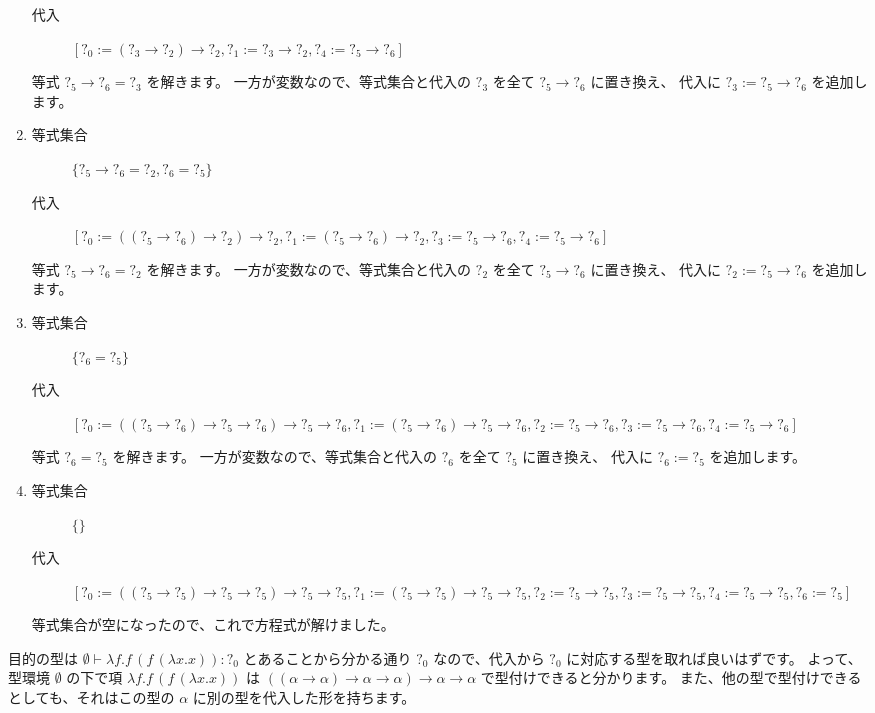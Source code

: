 \begin{enumerate}
\begin{description}
      \item[代入]
        $[?_0 := (?_3 \to ?_2) \to ?_2, ?_1 := ?_3 \to ?_2, ?_4 := ?_5 \to ?_6]$
    \end{description}
    等式 $?_5 \to ?_6 = ?_3$ を解きます。
    一方が変数なので、等式集合と代入の $?_3$ を全て $?_5 \to ?_6$ に置き換え、
    代入に $?_3 := ?_5 \to ?_6$ を追加します。
  \item
    \begin{description}
      \item[等式集合]
        $\{?_5 \to ?_6 = ?_2, ?_6 = ?_5\}$
      \item[代入]
        $[?_0 := ((?_5 \to ?_6) \to ?_2) \to ?_2, ?_1 := (?_5 \to ?_6) \to ?_2,
          ?_3 := ?_5 \to ?_6, ?_4 := ?_5 \to ?_6]$
    \end{description}
    等式 $?_5 \to ?_6 = ?_2$ を解きます。
    一方が変数なので、等式集合と代入の $?_2$ を全て $?_5 \to ?_6$ に置き換え、
    代入に $?_2 := ?_5 \to ?_6$ を追加します。
  \item
    \begin{description}
      \item[等式集合]
        $\{?_6 = ?_5\}$
      \item[代入]
        $[?_0 := ((?_5 \to ?_6) \to ?_5 \to ?_6) \to ?_5 \to ?_6,
          ?_1 := (?_5 \to ?_6) \to ?_5 \to ?_6, ?_2 := ?_5 \to ?_6, ?_3 := ?_5 \to ?_6,
          ?_4 := ?_5 \to ?_6]$
    \end{description}
    等式 $?_6 = ?_5$ を解きます。
    一方が変数なので、等式集合と代入の $?_6$ を全て $?_5$ に置き換え、
    代入に $?_6 := ?_5$ を追加します。
  \item
    \begin{description}
      \item[等式集合]
        $\{\}$
      \item[代入]
        $[?_0 := ((?_5 \to ?_5) \to ?_5 \to ?_5) \to ?_5 \to ?_5,
          ?_1 := (?_5 \to ?_5) \to ?_5 \to ?_5, ?_2 := ?_5 \to ?_5, ?_3 := ?_5 \to ?_5,
          ?_4 := ?_5 \to ?_5, ?_6 := ?_5]$
    \end{description}
    等式集合が空になったので、これで方程式が解けました。
\end{enumerate}

目的の型は $\emptyset \vdash \lambda f . f \, (f \, (\lambda x . x)) : ?_0$ とあることから分かる通り
$?_0$ なので、代入から $?_0$ に対応する型を取れば良いはずです。
よって、型環境 $\emptyset$ の下で項 $\lambda f . f \, (f \, (\lambda x . x))$ は
$((\alpha \to \alpha) \to \alpha \to \alpha) \to \alpha \to \alpha$ で型付けできると分かります。
また、他の型で型付けできるとしても、それはこの型の $\alpha$ に別の型を代入した形を持ちます。

